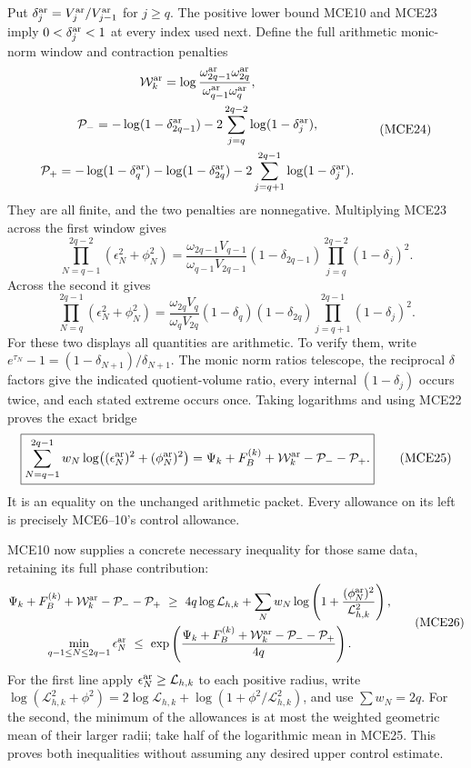 \documentclass[11pt,a4paper]{article}
\begin{document}
Put $\delta_j^{\rm ar}=V_j^{\rm ar}/V_{j-1}^{\rm ar}$ for $j\ge q$.
The positive lower bound MCE10 and MCE23 imply
$0<\delta_j^{\rm ar}<1$ at every index used next. Define the full
arithmetic monic-norm window and contraction penalties
\[
 \begin{gathered}
 \mathcal W_k^{\rm ar}
     =\log\frac{\omega_{2q-1}^{\rm ar}\omega_{2q}^{\rm ar}}
                       {\omega_{q-1}^{\rm ar}\omega_q^{\rm ar}},\\
 \mathcal P_-=-\log(1-\delta_{2q-1}^{\rm ar})
                  -2\sum_{j=q}^{2q-2}\log(1-\delta_j^{\rm ar}),\\
 \mathcal P_+=-\log(1-\delta_q^{\rm ar})-\log(1-\delta_{2q}^{\rm ar})
                  -2\sum_{j=q+1}^{2q-1}\log(1-\delta_j^{\rm ar}).
 \end{gathered}\tag{MCE24}
\]
They are all finite, and the two penalties are nonnegative.
Multiplying MCE23 across the first window gives
\[
 \prod_{N=q-1}^{2q-2}(\epsilon_N^2+\phi_N^2)
 =\frac{\omega_{2q-1}V_{q-1}}{\omega_{q-1}V_{2q-1}}
   (1-\delta_{2q-1})\prod_{j=q}^{2q-2}(1-\delta_j)^2.
\]
Across the second it gives
\[
 \prod_{N=q}^{2q-1}(\epsilon_N^2+\phi_N^2)
 =\frac{\omega_{2q}V_q}{\omega_qV_{2q}}
   (1-\delta_q)(1-\delta_{2q})
                      \prod_{j=q+1}^{2q-1}(1-\delta_j)^2.
\]
For these two displays all quantities are arithmetic. To verify them,
write $e^{\tau_N}-1=(1-\delta_{N+1})/\delta_{N+1}$.
The monic norm ratios telescope, the reciprocal $\delta$ factors
give the indicated quotient-volume ratio, every internal
$(1-\delta_j)$ occurs twice, and each stated extreme occurs once.
Taking logarithms and using MCE22 proves the exact bridge
\[
 \boxed{
 \sum_{N=q-1}^{2q-1}w_N
       \log\bigl((\epsilon_N^{\rm ar})^2+(\phi_N^{\rm ar})^2\bigr)
 =\Psi_k+F_B^{(k)}+\mathcal W_k^{\rm ar}-\mathcal P_--\mathcal P_+ .}
 \tag{MCE25}
\]
It is an equality on the unchanged arithmetic packet. Every
allowance on its left is precisely MCE6--10's control allowance.

MCE10 now supplies a concrete necessary inequality for those same
data, retaining its full phase contribution:
\[
 \begin{gathered}
 \Psi_k+F_B^{(k)}+\mathcal W_k^{\rm ar}-\mathcal P_--\mathcal P_+
 \ \ge\ 4q\log\mathcal L_{h,k}
       +\sum_Nw_N\log\left(1+
                   \frac{(\phi_N^{\rm ar})^2}{\mathcal L_{h,k}^2}\right),\\
 \min_{q-1\le N\le2q-1}\epsilon_N^{\rm ar}
 \ \le\ \exp\left(
   \frac{\Psi_k+F_B^{(k)}+\mathcal W_k^{\rm ar}-\mathcal P_--\mathcal P_+}
              {4q}\right).
 \end{gathered}\tag{MCE26}
\]
For the first line apply
$\epsilon_N^{\rm ar}\ge\mathcal L_{h,k}$ to each positive
radius, write
$\log(\mathcal L_{h,k}^2+\phi^2)=2\log\mathcal L_{h,k}
+\log(1+\phi^2/\mathcal L_{h,k}^2)$, and use
$\sum w_N=2q$. For the second, the minimum of the allowances
is at most the weighted geometric mean of their larger radii;
take half of the logarithmic mean in MCE25. This proves both
inequalities without assuming any desired upper control estimate.
\end{document}
